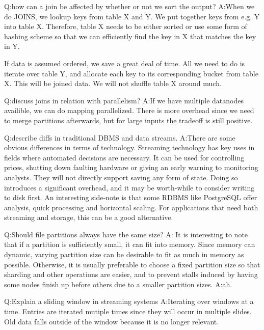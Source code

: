 Q:\@ how can a join be affected by whether or not we sort the output?
\newline A:\@ When we do JOINS, we lookup keys from table X and Y. We put together keys from e.g. Y into table X. Therefore, table X needs to be either sorted or use some form of hashing scheme so that we can efficiently find the key in X that matches the key in Y.

If data is assumed ordered, we save a great deal of time. All we need to do is iterate over table Y, and allocate each key to its corresponding bucket from table X. This will be joined data. We will not shuffle table X around much.  

Q:\@ discuss joins in relation with parallelism?
\newline A:\@ If we have multiple datanodes availible, we can do mapping 
parallelized. There is more overhead since we need to merge partitions afterwards,
but for large inputs the tradeoff is still positive.

Q:\@ describe diffs in traditional DBMS and data streams.
\newline A:\@ There are some obvious differences in terms of technology. Streaming technology has key uses 
in fields where automated decisions are necessary. It can be used for controlling prices, 
shutting down faulting hardware or giving an early warning to monitoring analysts.
They will not directly  support saving any form of state. Doing so introduces a significant overhead,
and it may be worth-while to consider writing to disk first. 
An interesting side-note is that some RDBMS like PostgreSQL offer  analysis, quick processing and horizontal scaling. For applications that need both streaming and storage, this can
be a good alternative.

Q:\@ Should file partitions always have the same size?
A:\@
It is interesting to note that if a partition is sufficiently small, it can fit into memory.
Since memory can dynamic, varying partition size can be desirable to fit as much in memory as possible.
Otherwise, it is usually preferable to choose a fixed partition size so that sharding and 
other operations are easier, and to prevent stalls induced by having some nodes finish up
before others due to a smaller partition sizes.
\newline A:\@ ah.

Q:\@ Explain a sliding window in streaming systems
\newline A:\@ Iterating over windows at a time. Entries are  iterated mutiple times since they
will occur in multiple slides. Old data falls outside of the window because it is no longer relevant.

